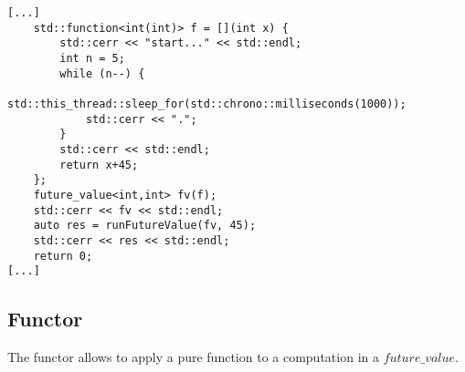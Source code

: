 \documentclass[12pt,fleqn]{article}
\begin{document}
%
%
\begin{minipage}{\linewidth}
\begin{lstlisting}[caption=Example of the use of the future value type class,label=fvexamp]
[...]
	std::function<int(int)> f = [](int x) { 
		std::cerr << "start..." << std::endl;
		int n = 5;
		while (n--) {
			std::this_thread::sleep_for(std::chrono::milliseconds(1000));
			std::cerr << ".";
		}
		std::cerr << std::endl;
		return x+45;
	};
	future_value<int,int> fv(f);
	std::cerr << fv << std::endl;
	auto res = runFutureValue(fv, 45);
	std::cerr << res << std::endl;
	return 0;
[...]
\end{lstlisting}
\end{minipage}
%
%
%



\subsection{Functor}

The functor allows to apply a pure function to a computation in a $future\_value$.
\end{document}
